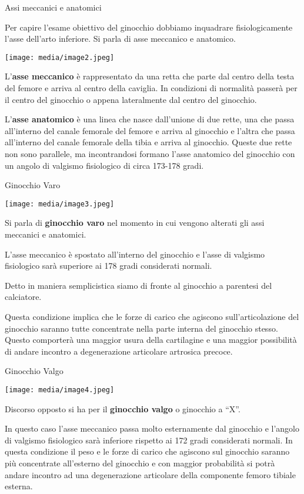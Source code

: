\documentclass[]{article}
\begin{document}
Assi meccanici e anatomici

Per capire l'esame obiettivo del ginocchio dobbiamo inquadrare
fisiologicamente l'asse dell'arto inferiore. Si parla di asse meccanico
e anatomico.

\texttt{[image: media/image2.jpeg]}

L'\textbf{asse meccanico} è rappresentato da una retta che parte dal
centro della testa del femore e arriva al centro della caviglia. In
condizioni di normalità passerà per il centro del ginocchio o appena
lateralmente dal centro del ginocchio.

L'\textbf{asse anatomico} è una linea che nasce dall'unione di due
rette, una che passa all'interno del canale femorale del femore e arriva
al ginocchio e l'altra che passa all'interno del canale femorale della
tibia e arriva al ginocchio. Queste due rette non sono parallele, ma
incontrandosi formano l'asse anatomico del ginocchio con un angolo di
valgismo fisiologico di circa 173-178 gradi.

Ginocchio Varo

\texttt{[image: media/image3.jpeg]}

Si parla di \textbf{ginocchio varo} nel momento in cui vengono alterati
gli assi meccanici e anatomici.

L'asse meccanico è spostato all'interno del ginocchio e l'asse di
valgismo fisiologico sarà superiore ai 178 gradi considerati normali.

Detto in maniera semplicistica siamo di fronte al ginocchio a parentesi
del calciatore.

Questa condizione implica che le forze di carico che agiscono
sull'articolazione del ginocchio saranno tutte concentrate nella parte
interna del ginocchio stesso. Questo comporterà una maggior usura della
cartilagine e una maggior possibilità di andare incontro a degenerazione
articolare artrosica precoce.

Ginocchio Valgo

\texttt{[image: media/image4.jpeg]}

Discorso opposto si ha per il \textbf{ginocchio valgo} o ginocchio a
``X''.

In questo caso l'asse meccanico passa molto esternamente dal ginocchio e
l'angolo di valgismo fisiologico sarà inferiore rispetto ai 172 gradi
considerati normali. In questa condizione il peso e le forze di carico
che agiscono sul ginocchio saranno più concentrate all'esterno del
ginocchio e con maggior probabilità si potrà andare incontro ad una
degenerazione articolare della componente femoro tibiale esterna.
\end{document}
